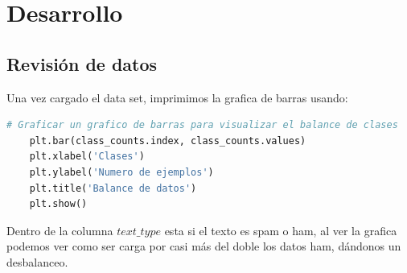 \section{Desarrollo}

\subsection{Revisión de datos}

Una vez cargado el data set, imprimimos la grafica de barras usando:

\begin{lstlisting}[style=mystylepython, language=Python, caption=codigo grafca de barras]
    # Graficar un grafico de barras para visualizar el balance de clases
    plt.bar(class_counts.index, class_counts.values)
    plt.xlabel('Clases')
    plt.ylabel('Numero de ejemplos')
    plt.title('Balance de datos')
    plt.show()
\end{lstlisting}

Dentro de la columna $text\_type$ esta si el texto es spam o ham, al ver la grafica podemos
ver como ser carga por casi más del doble los datos ham, dándonos un desbalanceo.


